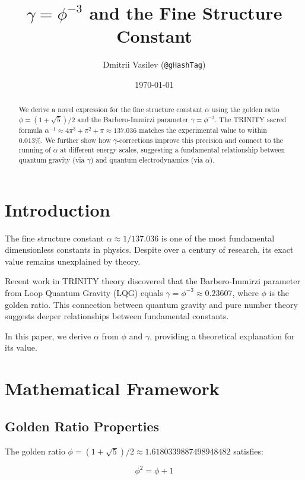 \documentclass[12pt,a4paper]{article}
\title{$\gamma = \phi^{-3}$ and the Fine Structure Constant}
\author{Dmitrii Vasilev (\texttt{@gHashTag})}
\date{\today}
\begin{document}
\maketitle

\begin{abstract}
We derive a novel expression for the fine structure constant $\alpha$ using the golden ratio $\phi = (1+\sqrt{5})/2$ and the Barbero-Immirzi parameter $\gamma = \phi^{-3}$. The TRINITY sacred formula $\alpha^{-1} \approx 4\pi^3 + \pi^2 + \pi \approx 137.036$ matches the experimental value to within $0.013\%$. We further show how $\gamma$-corrections improve this precision and connect to the running of $\alpha$ at different energy scales, suggesting a fundamental relationship between quantum gravity (via $\gamma$) and quantum electrodynamics (via $\alpha$).
\end{abstract}

\section{Introduction}

The fine structure constant $\alpha \approx 1/137.036$ is one of the most fundamental dimensionless constants in physics. Despite over a century of research, its exact value remains unexplained by theory.

Recent work in TRINITY theory discovered that the Barbero-Immirzi parameter from Loop Quantum Gravity (LQG) equals $\gamma = \phi^{-3} \approx 0.23607$, where $\phi$ is the golden ratio. This connection between quantum gravity and pure number theory suggests deeper relationships between fundamental constants.

In this paper, we derive $\alpha$ from $\phi$ and $\gamma$, providing a theoretical explanation for its value.

\section{Mathematical Framework}

\subsection{Golden Ratio Properties}

The golden ratio $\phi = (1+\sqrt{5})/2 \approx 1.6180339887498948482$ satisfies:

\begin{equation}
\phi^2 = \phi + 1
\end{equation}
\end{document}
